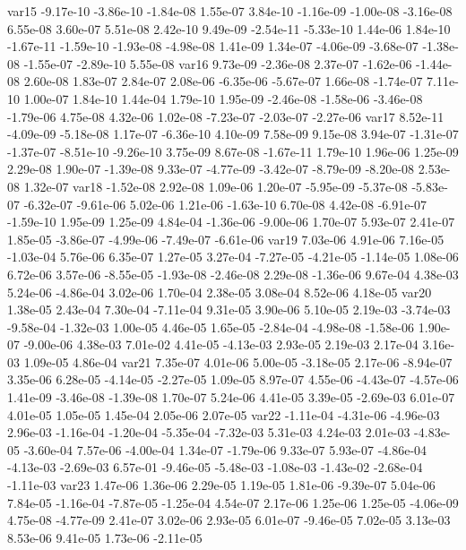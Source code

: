 var15 -9.17e-10 -3.86e-10 -1.84e-08  1.55e-07  3.84e-10 -1.16e-09 -1.00e-08 -3.16e-08  6.55e-08  3.60e-07  5.51e-08  2.42e-10  9.49e-09 -2.54e-11 -5.33e-10  1.44e-06  1.84e-10 -1.67e-11 -1.59e-10 -1.93e-08 -4.98e-08  1.41e-09  1.34e-07 -4.06e-09 -3.68e-07 -1.38e-08 -1.55e-07 -2.89e-10  5.55e-08
var16  9.73e-09 -2.36e-08  2.37e-07 -1.62e-06 -1.44e-08  2.60e-08  1.83e-07  2.84e-07  2.08e-06 -6.35e-06 -5.67e-07  1.66e-08 -1.74e-07  7.11e-10  1.00e-07  1.84e-10  1.44e-04  1.79e-10  1.95e-09 -2.46e-08 -1.58e-06 -3.46e-08 -1.79e-06  4.75e-08  4.32e-06  1.02e-08 -7.23e-07 -2.03e-07 -2.27e-06
var17  8.52e-11 -4.09e-09 -5.18e-08  1.17e-07 -6.36e-10  4.10e-09  7.58e-09  9.15e-08  3.94e-07 -1.31e-07 -1.37e-07 -8.51e-10 -9.26e-10  3.75e-09  8.67e-08 -1.67e-11  1.79e-10  1.96e-06  1.25e-09  2.29e-08  1.90e-07 -1.39e-08  9.33e-07 -4.77e-09 -3.42e-07 -8.79e-09 -8.20e-08  2.53e-08  1.32e-07
var18 -1.52e-08  2.92e-08  1.09e-06  1.20e-07 -5.95e-09 -5.37e-08 -5.83e-07 -6.32e-07 -9.61e-06  5.02e-06  1.21e-06 -1.63e-10  6.70e-08  4.42e-08 -6.91e-07 -1.59e-10  1.95e-09  1.25e-09  4.84e-04 -1.36e-06 -9.00e-06  1.70e-07  5.93e-07  2.41e-07  1.85e-05 -3.86e-07 -4.99e-06 -7.49e-07 -6.61e-06
var19  7.03e-06  4.91e-06  7.16e-05 -1.03e-04  5.76e-06  6.35e-07  1.27e-05  3.27e-04 -7.27e-05 -4.21e-05 -1.14e-05  1.08e-06  6.72e-06  3.57e-06 -8.55e-05 -1.93e-08 -2.46e-08  2.29e-08 -1.36e-06  9.67e-04  4.38e-03  5.24e-06 -4.86e-04  3.02e-06  1.70e-04  2.38e-05  3.08e-04  8.52e-06  4.18e-05
var20  1.38e-05  2.43e-04  7.30e-04 -7.11e-04  9.31e-05  3.90e-06  5.10e-05  2.19e-03 -3.74e-03 -9.58e-04 -1.32e-03  1.00e-05  4.46e-05  1.65e-05 -2.84e-04 -4.98e-08 -1.58e-06  1.90e-07 -9.00e-06  4.38e-03  7.01e-02  4.41e-05 -4.13e-03  2.93e-05  2.19e-03  2.17e-04  3.16e-03  1.09e-05  4.86e-04
var21  7.35e-07  4.01e-06  5.00e-05 -3.18e-05  2.17e-06 -8.94e-07  3.35e-06  6.28e-05 -4.14e-05 -2.27e-05  1.09e-05  8.97e-07  4.55e-06 -4.43e-07 -4.57e-06  1.41e-09 -3.46e-08 -1.39e-08  1.70e-07  5.24e-06  4.41e-05  3.39e-05 -2.69e-03  6.01e-07  4.01e-05  1.05e-05  1.45e-04  2.05e-06  2.07e-05
var22 -1.11e-04 -4.31e-06 -4.96e-03  2.96e-03 -1.16e-04 -1.20e-04 -5.35e-04 -7.32e-03  5.31e-03  4.24e-03  2.01e-03 -4.83e-05 -3.60e-04  7.57e-06 -4.00e-04  1.34e-07 -1.79e-06  9.33e-07  5.93e-07 -4.86e-04 -4.13e-03 -2.69e-03  6.57e-01 -9.46e-05 -5.48e-03 -1.08e-03 -1.43e-02 -2.68e-04 -1.11e-03
var23  1.47e-06  1.36e-06  2.29e-05  1.19e-05  1.81e-06 -9.39e-07  5.04e-06  7.84e-05 -1.16e-04 -7.87e-05 -1.25e-04  4.54e-07  2.17e-06  1.25e-06  1.25e-05 -4.06e-09  4.75e-08 -4.77e-09  2.41e-07  3.02e-06  2.93e-05  6.01e-07 -9.46e-05  7.02e-05  3.13e-03  8.53e-06  9.41e-05  1.73e-06 -2.11e-05
